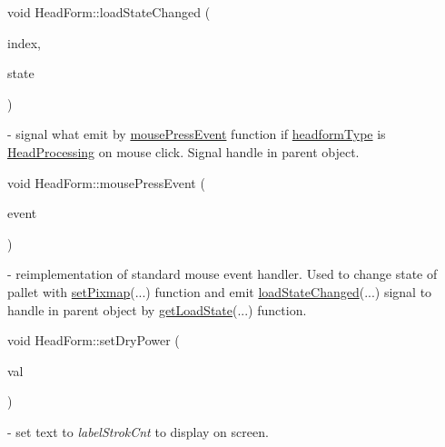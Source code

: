 \mbox{\label{classHeadForm_a6e4fb0f70f7571685094e53836bcbe21}} 
{\footnotesize\ttfamily void Head\+Form\+::\texorpdfstring{load\+State\+Changed}{loadStateChanged} (\begin{DoxyParamCaption}\item[{int}]{index,  }\item[{\mbox{\hyperlink{headform_8h_a56d194976643934b3332b3f99d82490d}{Load\+State}}}]{state }\end{DoxyParamCaption}){\ttfamily [signal]}} - signal what emit by \hyperlink{classHeadForm_a922c24b7eb4d084712d0ec4e9a084e90}{mouse\+Press\+Event} function if \hyperlink{classHeadForm_a5f448e8b1081f12332f699d029fa8433}{headform\+Type} is \hyperlink{classHeadForm_ae17d4f6887245f37b3f7c002dd226dd0a1aa31669b6be4f549f4635ab9bedf87c}{Head\+Processing} on mouse click. Signal handle in parent object.

\mbox{\label{classHeadForm_a922c24b7eb4d084712d0ec4e9a084e90}} 
{\footnotesize\ttfamily void Head\+Form\+::\texorpdfstring{mouse\+Press\+Event}{mousePressEvent} (\begin{DoxyParamCaption}\item[{Q\+Mouse\+Event $\ast$}]{event }\end{DoxyParamCaption}){\ttfamily [protected]}} - reimplementation of standard mouse event handler. Used to change state of pallet with \hyperlink{classHeadForm_ac2845f30dc7686178380c9c108b4c5bf}{set\+Pixmap}(...) function and emit \hyperlink{classHeadForm_a6e4fb0f70f7571685094e53836bcbe21}{load\+State\+Changed}(...) signal to handle in parent object by \hyperlink{classMainWindow_a7c2d999fc817728b31dccaaa1e72bd43}{get\+Load\+State}(...) function.

\mbox{\label{classHeadForm_afd37ba9a460ed5bf74c5b0b40394feb5}} 
{\footnotesize\ttfamily void Head\+Form\+::\texorpdfstring{set\+Dry\+Power}{setDryPower} (\begin{DoxyParamCaption}\item[{int}]{val }\end{DoxyParamCaption})} - set text to \textit{labelStrokCnt} to display on screen.

